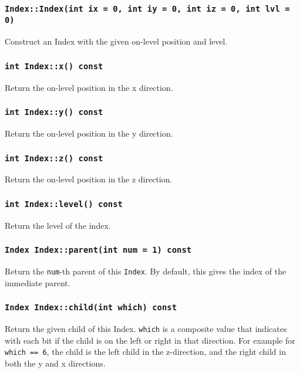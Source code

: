 \subsubsection{\texttt{Index::Index(int ix = 0, int iy = 0, int iz = 0, int lvl = 0)}}

Construct an Index with the given on-level position and level.

\subsubsection{\texttt{int Index::x() const}}

Return the on-level position in the x direction.

\subsubsection{\texttt{int Index::y() const}}

Return the on-level position in the y direction.

\subsubsection{\texttt{int Index::z() const}}

Return the on-level position in the z direction.

\subsubsection{\texttt{int Index::level() const}}

Return the level of the index.

\subsubsection{\texttt{Index Index::parent(int num = 1) const}}

Return the \texttt{num}-th parent of this \texttt{Index}. By default, this
gives the index of the immediate parent.

\subsubsection{\texttt{Index Index::child(int which) const}}

Return the given child of this Index. \texttt{which} is a composite value
that indicates with each bit if the child is on the left or right in that
direction. For example for \texttt{which == 6}, the child is the left child
in the z-direction, and the right child in both the y and x directions.

